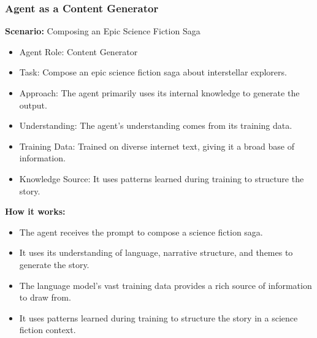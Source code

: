 \begin{frame}[fragile]
\frametitle{Agent as a Content Generator}

\textbf{Scenario:} Composing an Epic Science Fiction Saga

\begin{itemize}
    \item Agent Role: Content Generator
    \item Task: Compose an epic science fiction saga about interstellar explorers.
    \item Approach: The agent primarily uses its internal knowledge to generate the output.
    \item Understanding: The agent's understanding comes from its training data.
    \item Training Data: Trained on diverse internet text, giving it a broad base of information.
    \item Knowledge Source: It uses patterns learned during training to structure the story.
\end{itemize}

\textbf{How it works:}
\begin{itemize}
    \item The agent receives the prompt to compose a science fiction saga.
    \item It uses its understanding of language, narrative structure, and themes to generate the story.
    \item The language model's vast training data provides a rich source of information to draw from.
    \item It uses patterns learned during training to structure the story in a science fiction context.
\end{itemize}

\end{frame}



